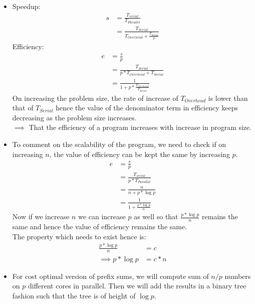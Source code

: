 \documentclass[11pt]{article}
\begin{document}
\begin{enumerate}
	\begin{itemize}
			\item 
					Speedup:
					\begin{align*}
						s &= \frac{T_{serial}}{T_{Parallel}} \\
							&= \frac{T_{Serial}}{T_{Overhead}+ \frac{T_{Serial}}{p}}
					\end{align*}
					Efficiency:
					\begin{align*}	
							e &= \frac{s}{p} \\
							&= \frac{T_{Serial}}{p*T_{Overhead}+ T_{Serial}}\\
							&= \frac{1}{1+ p*\frac{T_{Overhead}}{T_{Serial}}}
					\end{align*}
					On increasing the problem size, the rate of increase of $T_{Overhead}$ is lower than that of $T_{Serial}$ hence the value of the denominator term in efficiency keeps decreasing as the problem size increases. \\
					$\implies$ That the efficiency of a program increases with increase in program size.
		\item To comment on the scalability of the program, we need to check if on increasing $n$, the value of efficiency can be kept the same by increasing $p$. \\
				\begin{align*}
					e &= \frac{s}{p} \\
					&= \frac{T_{serial}}{p*T_{Parallal}}\\
					&= \frac{n}{n+p*{\log p}}\\
					&= \frac{1}{1+\frac{p*{\log p}}{n}}
				\end{align*}
				Now if we increase $n$ we can increase $p$ as well so that $\frac{p*{\log p}}{n}$ remains the same and hence the value of efficiency remains the same.
				\\ The property which needs to exist hence is: \\
				\begin{align*}
						\frac{p*{\log p}}{n} &= c \\
						\implies p*{\log p} &= c*n
				\end{align*}
		\item For cost optimal version of prefix sums, we will compute sum of $n/p$ numbers on $p$ different cores in parallel. 
				Then we will add the results in a binary tree fashion such that the tree is of height of $\log p$.
				\\ 
				\begin{enumerate}

\end{enumerate}
\end{itemize}
\end{enumerate}
\end{document}

